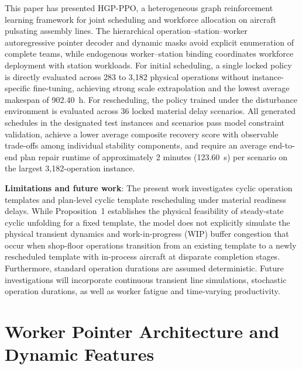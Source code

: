 \documentclass[journal,10pt]{IEEEtran}
\begin{document}
This paper has presented HGP-PPO, a heterogeneous graph reinforcement learning framework for joint scheduling and workforce allocation on aircraft pulsating assembly lines. The hierarchical operation--station--worker autoregressive pointer decoder and dynamic masks avoid explicit enumeration of complete teams, while endogenous worker--station binding coordinates workforce deployment with station workloads. For initial scheduling, a single locked policy is directly evaluated across 283 to 3,182 physical operations without instance-specific fine-tuning, achieving strong scale extrapolation and the lowest average makespan of 902.40~h. For rescheduling, the policy trained under the disturbance environment is evaluated across 36 locked material delay scenarios. All generated schedules in the designated test instances and scenarios pass model constraint validation, achieve a lower average composite recovery score with observable trade-offs among individual stability components, and require an average end-to-end plan repair runtime of approximately 2 minutes (123.60~s) per scenario on the largest 3,182-operation instance.

\textbf{Limitations and future work}: The present work investigates cyclic operation templates and plan-level cyclic template rescheduling under material readiness delays. While Proposition~1 establishes the physical feasibility of steady-state cyclic unfolding for a fixed template, the model does not explicitly simulate the physical transient dynamics and work-in-progress (WIP) buffer congestion that occur when shop-floor operations transition from an existing template to a newly rescheduled template with in-process aircraft at disparate completion stages. Furthermore, standard operation durations are assumed deterministic. Future investigations will incorporate continuous transient line simulations, stochastic operation durations, as well as worker fatigue and time-varying productivity.

\appendices

\section{Worker Pointer Architecture and Dynamic Features}\label{app:worker_pointer}
\end{document}
